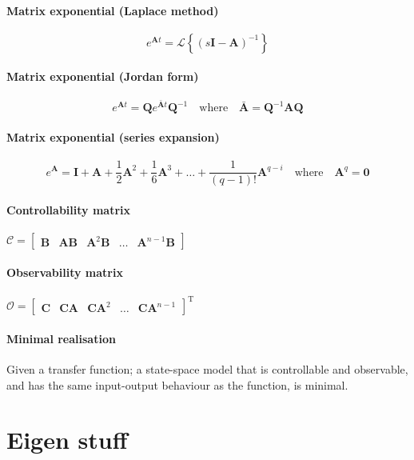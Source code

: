 \documentclass[a4paper]{article}
\newcommand{\M}[1]{\bm{#1}}
\newcommand{\Mc}[1]{\mathbf{#1}}
\newcommand{\lagrange}{\mathscr{L}}
\begin{document}
\paragraph{Matrix exponential (Laplace method)}
$$e^{\M{A}t} = \lagrange \left\{ (s\Mc{I}-\M{A})^{-1} \right\}$$

\paragraph{Matrix exponential (Jordan form)}
$$e^{\M{A}t} = \M{Q} e^{\bar{\M{A}}t} \M{Q}^{-1} \quad \text{where} \quad \bar{\M{A}} = \M{Q}^{-1}\M{AQ}$$

\paragraph{Matrix exponential (series expansion)}
$$
e^{\M{A}} = \Mc{I} + \M{A} + \frac{1}{2}\M{A}^2 + \frac{1}{6}\M{A}^3 + \dots + \frac{1}{(q-1)!}\M{A}^{q-i}
\quad \text{where} \quad
\M{A}^q = \Mc{0}
$$

\paragraph{Controllability matrix}
$\mathcal{C} = \begin{bmatrix}\M{B} & \M{AB} & \M{A}^{2}\M{B} & \hdots & \M{A}^{n-1}\M{B}\end{bmatrix}$

\paragraph{Observability matrix}
$\mathcal{O} = \begin{bmatrix}\M{C} & \M{CA} & \M{CA}^2 & \hdots & \M{CA}^{n-1}\end{bmatrix}^{\text{T}}$

\paragraph{Minimal realisation}
Given a transfer function; a state-space model that is controllable and observable, and has the same input-output behaviour as the function, is minimal.



\section{Eigen stuff}
\end{document}
